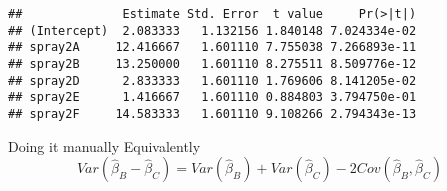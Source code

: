\documentclass[12pt,openright,oneside,a4paper,chapter=TITLE,section=TITLE,subsection=Title,english,french,spanish,portugues,sumario=tradicional]{04-class-files/abntex2}
\newenvironment{Shaded}{\begin{snugshade}}{\end{snugshade}}
\newcommand{\CommentTok}[1]{\textcolor[rgb]{0.56,0.35,0.01}{\textit{#1}}}
\newcommand{\DataTypeTok}[1]{\textcolor[rgb]{0.13,0.29,0.53}{#1}}
\newcommand{\DecValTok}[1]{\textcolor[rgb]{0.00,0.00,0.81}{#1}}
\newcommand{\KeywordTok}[1]{\textcolor[rgb]{0.13,0.29,0.53}{\textbf{#1}}}
\newcommand{\NormalTok}[1]{#1}
\newcommand{\OperatorTok}[1]{\textcolor[rgb]{0.81,0.36,0.00}{\textbf{#1}}}
\newcommand{\StringTok}[1]{\textcolor[rgb]{0.31,0.60,0.02}{#1}}
\begin{document}
\begin{verbatim}
##              Estimate Std. Error  t value     Pr(>|t|)
## (Intercept)  2.083333   1.132156 1.840148 7.024334e-02
## spray2A     12.416667   1.601110 7.755038 7.266893e-11
## spray2B     13.250000   1.601110 8.275511 8.509776e-12
## spray2D      2.833333   1.601110 1.769606 8.141205e-02
## spray2E      1.416667   1.601110 0.884803 3.794750e-01
## spray2F     14.583333   1.601110 9.108266 2.794343e-13
\end{verbatim}

Doing it manually
Equivalently
\[Var(\hat \beta_B - \hat \beta_C) = Var(\hat \beta_B) + Var(\hat \beta_C) - 2 Cov(\hat \beta_B, \hat \beta_C)\]

\begin{Shaded}
\end{Shaded}
\end{document}
